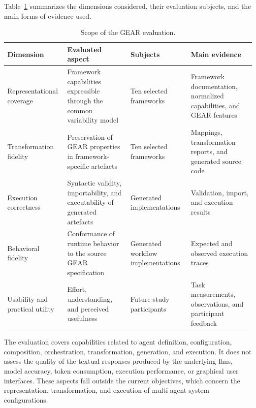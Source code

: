 Table~\ref{tab:evaluation-scope} summarizes the dimensions considered, their
evaluation subjects, and the main forms of evidence used.

\begin{table}[t]
    \centering
    \caption{Scope of the GEAR evaluation.}
    \label{tab:evaluation-scope}
    \footnotesize
    \begin{tabularx}{\textwidth}{
        @{}
        p{}
        p{}
        p{}
        >{\raggedright\arraybackslash}X
        @{}
    }
        \toprule
        \textbf{Dimension}
        & \textbf{Evaluated aspect}
        & \textbf{Subjects}
        & \textbf{Main evidence} \\
        \midrule

        Representational coverage
        & Framework capabilities expressible through the common variability model
        & Ten selected frameworks
        & Framework documentation, normalized capabilities, and GEAR features \\

        Transformation fidelity
        & Preservation of GEAR properties in framework-specific artefacts
        & Ten selected frameworks
        & Mappings, transformation reports, and generated source code \\

        Execution correctness
        & Syntactic validity, importability, and executability of generated artefacts
        & Generated implementations
        & Validation, import, and execution results \\

        Behavioral fidelity
        & Conformance of runtime behavior to the source GEAR specification
        & Generated workflow implementations
        & Expected and observed execution traces \\

        Usability and practical utility
        & Effort, understanding, and perceived usefulness
        & Future study participants
        & Task measurements, observations, and participant feedback \\

        \bottomrule
    \end{tabularx}
\end{table}

The evaluation covers capabilities related to agent definition, configuration,
composition, orchestration, transformation, generation, and execution. It does not
assess the quality of the textual responses produced by the underlying
\gls{llm}s, model accuracy, token consumption, execution performance, or graphical
user interfaces. These aspects fall outside the current objectives, which concern
the representation, transformation, and execution of multi-agent system
configurations.

